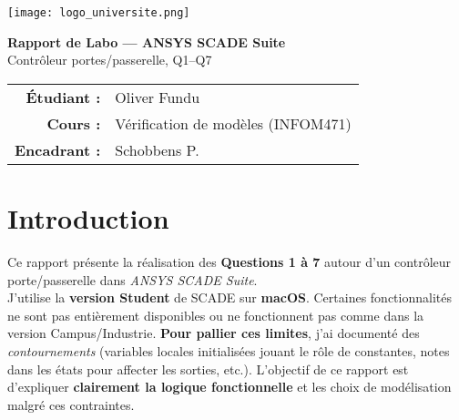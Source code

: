 \documentclass[11pt,a4paper]{report}
\begin{document}
\begin{titlepage}
  \centering
  \vspace*{1cm}

  \texttt{[image: logo\_universite.png]}\par
  \vspace{1.2cm}


  {\huge \textbf{Rapport de Labo — ANSYS SCADE Suite}}\\[0.6cm]
  {\Large Contrôleur portes/passerelle, Q1–Q7}\\[1.2cm]

  \begin{tabular}{rl}
    \textbf{Étudiant :} & Oliver Fundu \\
    \textbf{Cours :} & Vérification de modèles (INFOM471) \\
    \textbf{Encadrant :} & Schobbens P. \\
    
  \end{tabular}

  \vfill
  \vspace{0.8cm}
\end{titlepage}

\tableofcontents
\newpage

\chapter*{Introduction}
Ce rapport présente la réalisation des \textbf{Questions 1 à 7} autour d’un contrôleur
porte/passerelle dans \textit{ANSYS SCADE Suite}.\\[0.4em]
 J’utilise la \textbf{version Student} de SCADE sur \textbf{macOS}.
Certaines fonctionnalités  ne sont pas entièrement disponibles ou ne fonctionnent pas
comme dans la version Campus/Industrie. \textbf{Pour pallier ces limites}, j’ai documenté
des \textit{contournements} (variables locales initialisées jouant le rôle de constantes, notes
dans les états pour affecter les sorties, etc.). L’objectif de ce rapport est d’expliquer
\textbf{clairement la logique fonctionnelle} et les choix de modélisation malgré ces contraintes.
\end{document}
